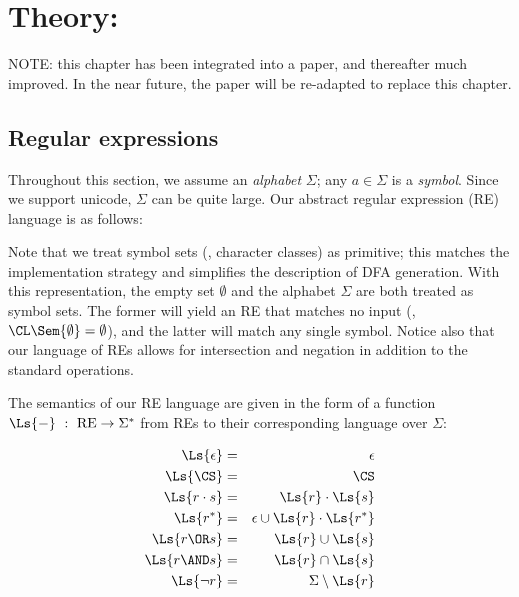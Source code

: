 \chapter[\ulex]{Theory: \ulex}\label{ch:ulex-theory}

{\Large NOTE: this chapter has been integrated into a paper, and thereafter much improved.  In the near future, the paper will be re-adapted to replace this chapter.}

\section{Regular expressions}

Throughout this section, we assume an \emph{alphabet} $\Sigma$; any $a \in \Sigma$ is a \emph{symbol}.  Since we support unicode, $\Sigma$ can be quite large.  Our abstract regular expression (RE) language is as follows:


Note that we treat symbol sets (\ie{}, character classes) as primitive; this matches the implementation strategy and simplifies the description of DFA generation.  With this representation, the empty set $\emptyset$ and the alphabet $\Sigma$ are both treated as symbol sets.  The former will yield an RE that matches no input (\ie{}, $\CL\Sem{\emptyset} = \emptyset$), and the latter will match any single symbol.  Notice also that our language of REs allows for intersection and negation in addition to the standard operations.

The semantics of our RE language are given in the form of a function $\Ls{-} \ : \ \mathrm{RE} \rightarrow \Sigma^*$ from REs to their corresponding language over $\Sigma$:

\begin{eqnarray*}
\Ls{\epsilon} 	&=& 	\epsilon \\
\Ls{\CS}		&=& 	\CS \\
\Ls{r\cdot s}	&=& 	\Ls{r} \cdot \Ls{s} \\
\Ls{r^*}		&=& 	\epsilon \cup \Ls{r}\cdot\Ls{r^*} \\
\Ls{r \OR s}	&=&		\Ls{r} \cup \Ls{s} \\
\Ls{r \AND s}	&=& 	\Ls{r} \cap \Ls{s} \\
\Ls{\neg r}		&=& 	\Sigma \setminus \Ls{r}
\end{eqnarray*}

